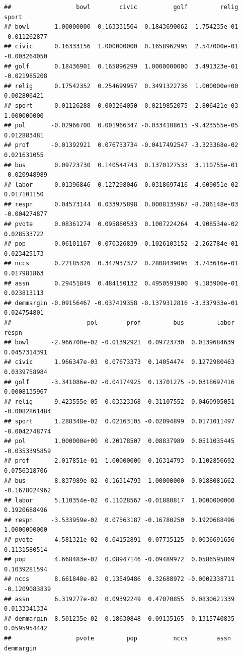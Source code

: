 \documentclass[
  english,
  man]{apa6}
\begin{document}
\begin{verbatim}
##                  bowl        civic          golf         relig        sport
## bowl       1.00000000  0.163331564  0.1843690062  1.754235e-01 -0.011262877
## civic      0.16333156  1.000000000  0.1658962995  2.547000e-01 -0.003264050
## golf       0.18436901  0.165896299  1.0000000000  3.491323e-01 -0.021985208
## relig      0.17542352  0.254699957  0.3491322736  1.000000e+00  0.002806421
## sport     -0.01126288 -0.003264050 -0.0219852075  2.806421e-03  1.000000000
## pol       -0.02966700  0.001966347 -0.0334108615 -9.423555e-05  0.012883481
## prof      -0.01392921  0.076733734 -0.0417492547 -3.323368e-02  0.021631055
## bus        0.09723730  0.140544743  0.1370127533  3.110755e-01 -0.020948989
## labor      0.01396846  0.127298046 -0.0318697416 -4.609051e-02  0.017101150
## respn      0.04573144  0.033975898  0.0008135967 -8.286148e-03 -0.004274877
## pvote      0.08361274  0.095880533  0.1007224264  4.908534e-02  0.028533722
## pop       -0.06101167 -0.070326839 -0.1026103152 -2.262784e-01  0.023425173
## nccs       0.22185326  0.347937372  0.2808439095  3.743616e-01  0.017981863
## assn       0.29451849  0.484150132  0.4950591900  9.183900e-01  0.023813113
## demmargin -0.09156467 -0.037419358 -0.1379312816 -3.337933e-01  0.024754801
##                     pol        prof         bus         labor         respn
## bowl      -2.966700e-02 -0.01392921  0.09723730  0.0139684639  0.0457314391
## civic      1.966347e-03  0.07673373  0.14054474  0.1272980463  0.0339758984
## golf      -3.341086e-02 -0.04174925  0.13701275 -0.0318697416  0.0008135967
## relig     -9.423555e-05 -0.03323368  0.31107552 -0.0460905051 -0.0082861484
## sport      1.288348e-02  0.02163105 -0.02094899  0.0171011497 -0.0042748774
## pol        1.000000e+00  0.20178507  0.08837989  0.0511035445 -0.0353395859
## prof       2.017851e-01  1.00000000  0.16314793  0.1102856692  0.0756318706
## bus        8.837989e-02  0.16314793  1.00000000 -0.0188081662 -0.1678024962
## labor      5.110354e-02  0.11028567 -0.01880817  1.0000000000  0.1920688496
## respn     -3.533959e-02  0.07563187 -0.16780250  0.1920688496  1.0000000000
## pvote      4.581321e-02  0.04152891  0.07735125 -0.0036691656  0.1131580514
## pop        4.668483e-02  0.08947146 -0.09489972  0.0586595869  0.1039281594
## nccs       8.661840e-02  0.13549486  0.32688972 -0.0002338711 -0.1209083839
## assn       6.319277e-02  0.09392249  0.47070855  0.0830621339  0.0133341334
## demmargin  8.501235e-02  0.18630848 -0.09135165  0.1315740835  0.0595954442
##                  pvote         pop          nccs        assn   demmargin

\end{verbatim}
\end{document}
